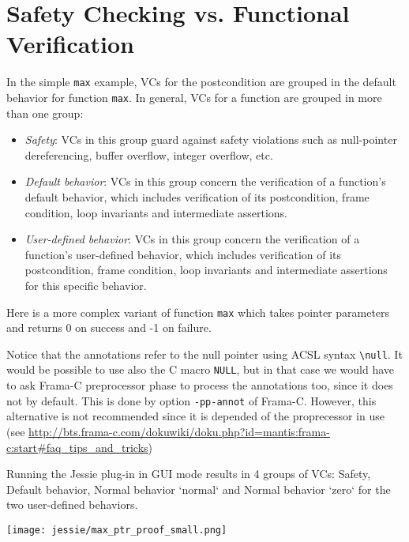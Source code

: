 \documentclass[a4paper,11pt,twoside,openright]{report}
\begin{document}
\section{Safety Checking vs. Functional Verification}

In the simple \verb|max| example, VCs for the postcondition are grouped
in the default behavior for function \verb|max|. In general, VCs for a
function are grouped in more than one group:

\begin{itemize}
\item \textit{Safety}: VCs in this group guard against safety violations
  such as null-pointer dereferencing, buffer overflow, integer overflow, etc.
\item \textit{Default behavior}: VCs in this group concern the
  verification of a function's default behavior, which includes
  verification of its postcondition, frame condition, loop invariants
  and intermediate assertions.
\item \textit{User-defined behavior}: VCs in this group concern the
  verification of a function's user-defined behavior, which includes
  verification of its postcondition, frame condition, loop invariants
  and intermediate assertions for this specific behavior.
\end{itemize}

Here is a more complex variant of function \verb|max| which takes
pointer parameters and returns 0 on success and -1 on failure.



Notice that the annotations refer to the null pointer using ACSL
syntax \verb|\null|. It would be possible to use also the C macro
\texttt{NULL}, but in that case we would have to ask Frama-C
preprocessor phase to process the annotations too, since it does not
by default. This is done by option \verb|-pp-annot| of
Frama-C. However, this alternative is not recommended since it is
depended of the proprecessor in use (see \url{http://bts.frama-c.com/dokuwiki/doku.php?id=mantis:frama-c:start#faq_tips_and_tricks})

Running the Jessie plug-in in GUI mode results in 4 groups of VCs:
Safety, Default behavior, Normal behavior `normal` and Normal behavior
`zero` for the two user-defined behaviors.

\begin{center}
  \texttt{[image: jessie/max\_ptr\_proof\_small.png]}
\end{center}
\end{document}
